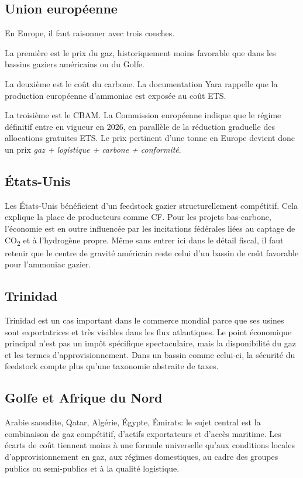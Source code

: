 \documentclass[11pt]{article}
\begin{document}
\subsection{Union européenne}

En Europe, il faut raisonner avec trois couches.

La première est le prix du gaz, historiquement moins favorable que dans les bassins gaziers américains ou du Golfe.

La deuxième est le coût du carbone. La documentation Yara rappelle que la production européenne d'ammoniac est exposée au coût ETS.

La troisième est le CBAM. La Commission européenne indique que le régime définitif entre en vigueur en 2026, en parallèle de la réduction graduelle des allocations gratuites ETS. Le prix pertinent d'une tonne en Europe devient donc un prix \emph{gaz + logistique + carbone + conformité}.

\subsection{États-Unis}

Les États-Unis bénéficient d'un feedstock gazier structurellement compétitif. Cela explique la place de producteurs comme CF. Pour les projets bas-carbone, l'économie est en outre influencée par les incitations fédérales liées au captage de CO\textsubscript{2} et à l'hydrogène propre. Même sans entrer ici dans le détail fiscal, il faut retenir que le centre de gravité américain reste celui d'un bassin de coût favorable pour l'ammoniac gazier.

\subsection{Trinidad}

Trinidad est un cas important dans le commerce mondial parce que ses usines sont exportatrices et très visibles dans les flux atlantiques. Le point économique principal n'est pas un impôt spécifique spectaculaire, mais la disponibilité du gaz et les termes d'approvisionnement. Dans un bassin comme celui-ci, la sécurité du feedstock compte plus qu'une taxonomie abstraite de taxes.

\subsection{Golfe et Afrique du Nord}

Arabie saoudite, Qatar, Algérie, Égypte, Émirats: le sujet central est la combinaison de gaz compétitif, d'actifs exportateurs et d'accès maritime. Les écarts de coût tiennent moins à une formule universelle qu'aux conditions locales d'approvisionnement en gaz, aux régimes domestiques, au cadre des groupes publics ou semi-publics et à la qualité logistique.
\end{document}
